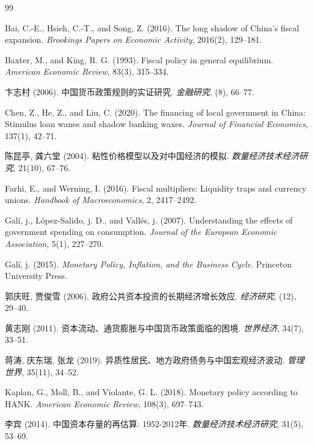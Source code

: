 \documentclass[12pt,UTF8]{ctexart}
\begin{document}
	\begin{thebibliography}{99}
		\addtolength{\itemsep}{-0.3em}
		
		Bai, C.-E., Hsieh, C.-T., and Song, Z. (2016). The long shadow of China's fiscal expansion. \textit{Brookings Papers on Economic Activity}, 2016(2), 129--181.
		
		Baxter, M., and King, R. G. (1993). Fiscal policy in general equilibrium. \textit{American Economic Review}, 83(3), 315--334.
		
		卞志村 (2006). 中国货币政策规则的实证研究. \textit{金融研究}, (8), 66--77.
		
		Chen, Z., He, Z., and Liu, C. (2020). The financing of local government in China: Stimulus loan wanes and shadow banking waxes. \textit{Journal of Financial Economics}, 137(1), 42--71.
		
		陈昆亭, 龚六堂 (2004). 粘性价格模型以及对中国经济的模拟. \textit{数量经济技术经济研究}, 21(10), 67--76.
		
		Farhi, E., and Werning, I. (2016). Fiscal multipliers: Liquidity traps and currency unions. \textit{Handbook of Macroeconomics}, 2, 2417--2492.
		
		Galí, j., López-Salido, j. D., and Vallés, j. (2007). Understanding the effects of government spending on consumption. \textit{Journal of the European Economic Association}, 5(1), 227--270.
		
		Galí, j. (2015). \textit{Monetary Policy, Inflation, and the Business Cycle}. Princeton University Press.
		
		郭庆旺, 贾俊雪 (2006). 政府公共资本投资的长期经济增长效应. \textit{经济研究}, (12), 29--40.
		
		黄志刚 (2011). 资本流动、通货膨胀与中国货币政策面临的困境. \textit{世界经济}, 34(7), 33--51.
		
		蒋涛, 庆东瑞, 张龙 (2019). 异质性居民、地方政府债务与中国宏观经济波动. \textit{管理世界}, 35(11), 34--52.
		
		Kaplan, G., Moll, B., and Violante, G. L. (2018). Monetary policy according to HANK. \textit{American Economic Review}, 108(3), 697--743.
		
		李宾 (2014). 中国资本存量的再估算: 1952-2012年. \textit{数量经济技术经济研究}, 31(5), 53--69.
		

\end{thebibliography}
\end{document}
